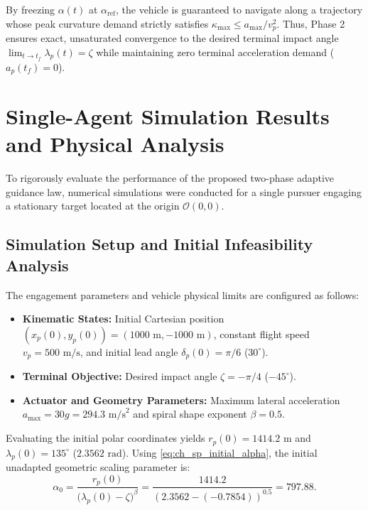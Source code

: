 By freezing $\alpha(t)$ at $\alpha_{\text{ref}}$, the vehicle is guaranteed to navigate along a trajectory whose peak curvature demand strictly satisfies $\kappa_{\max} \le a_{\max} / v_p^2$. Thus, Phase 2 ensures exact, unsaturated convergence to the desired terminal impact angle $\lim_{t \to t_f} \lambda_p(t) = \zeta$ while maintaining zero terminal acceleration demand ($a_p(t_f) = 0$).

\section{Single-Agent Simulation Results and Physical Analysis}\label{sec:ch_sp_single_sims}

To rigorously evaluate the performance of the proposed two-phase adaptive guidance law, numerical simulations were conducted for a single pursuer engaging a stationary target located at the origin $\mathcal{O}(0,0)$.

\subsection{Simulation Setup and Initial Infeasibility Analysis}\label{subsec:ch_sp_sim_setup}

The engagement parameters and vehicle physical limits are configured as follows:
\begin{itemize}
    \item \textbf{Kinematic States:} Initial Cartesian position $(x_p(0), y_p(0)) = (1000\text{ m}, -1000\text{ m})$, constant flight speed $v_p = 500\text{ m/s}$, and initial lead angle $\delta_p(0) = \pi/6$ ($30^\circ$).
    \item \textbf{Terminal Objective:} Desired impact angle $\zeta = -\pi/4$ ($-45^\circ$).
    \item \textbf{Actuator and Geometry Parameters:} Maximum lateral acceleration $a_{\max} = 30g = 294.3\text{ m/s}^2$ and spiral shape exponent $\beta = 0.5$.
\end{itemize}

Evaluating the initial polar coordinates yields $r_p(0) = 1414.2\text{ m}$ and $\lambda_p(0) = 135^\circ$ ($2.3562\text{ rad}$). Using \eqref{eq:ch_sp_initial_alpha}, the initial unadapted geometric scaling parameter is:
\begin{equation}\label{eq:ch_sp_sim_alpha0}
    \alpha_0 = \frac{r_p(0)}{\big(\lambda_p(0) - \zeta\big)^\beta} = \frac{1414.2}{(2.3562 - (-0.7854))^{0.5}} = 797.88.
\end{equation}

